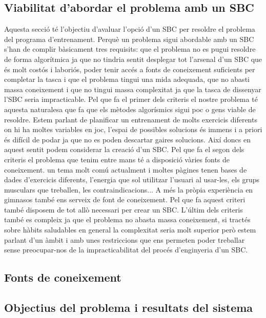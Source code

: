 \subsection{Viabilitat d'abordar el problema amb un SBC}
Aquesta secció té l'objectiu d'avaluar l'opció d'un SBC per resoldre el problema del programa d'entrenament. 
Perquè un problema sigui abordable amb un SBC s'han de complir bàsicament tres requisits: que el problema no es pugui resoldre de forma algorítmica ja que no tindria sentit desplegar tot l'arsenal d'un SBC que és molt costós i laboriós, poder tenir accés a fonts de coneixement suficients per completar la tasca i que el problema tingui una mida adequada, que no abasti massa coneixement i que no tingui massa complexitat ja que la tasca de dissenyar l'SBC seria impracticable.
\newline
\newline
Pel que fa el primer dels criteris el nostre problema té aquesta naturalesa que fa que els mètodes algorísmics sigui poc o gens viable de resoldre. Estem parlant de planificar un entrenament de molts exercicis diferents on hi ha moltes variables en joc, l'espai de possibles solucions és immens i a priori és difícil de podar ja que no es poden descartar gaires solucions.
Així doncs en aquest sentit podem considerar la creació d'un SBC.
\newline
\newline
Pel que fa el segon dels criteris el problema que tenim entre mans té a disposició vàries fonts de coneixement. 
un tema molt comú actualment i moltes pàgines tenen bases de dades d'exercicis diferents, l'energia que sol utilitzar l'usuari al usar-les, els grups musculars que treballen, les contraindicacions... 
A més la pròpia experiència en gimnasos també ens serveix de font de coneixement. 
Pel que fa aquest criteri també disposem de tot allò necessari per crear un SBC.
\newline
\newline
L'últim dels criteris també es compleix ja que el problema no abasta massa coneixement, si tractés sobre hàbits saludables en general la complexitat seria molt superior però estem parlant d'un àmbit i amb unes restriccions que ens permeten poder treballar sense preocupar-nos de la impracticabilitat del procés d'enginyeria d'un SBC.





\subsection{Fonts de coneixement}
\subsection{Objectius del problema i resultats del sistema}